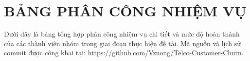 \documentclass[a4paper]{article}
\begin{document}
{
\enlargethispage{1.5cm}
\setlength{\parskip}{2pt}
\linespread{1.05}\selectfont

\section*{BẢNG PHÂN CÔNG NHIỆM VỤ}

\noindent Dưới đây là bảng tổng hợp phân công nhiệm vụ chi tiết và mức độ hoàn thành của các thành viên nhóm trong giai đoạn thực hiện đề tài. Mã nguồn và lịch sử commit được công khai tại: \url{https://github.com/Vzuong/Telco-Customer-Churn}.

}
\end{document}
